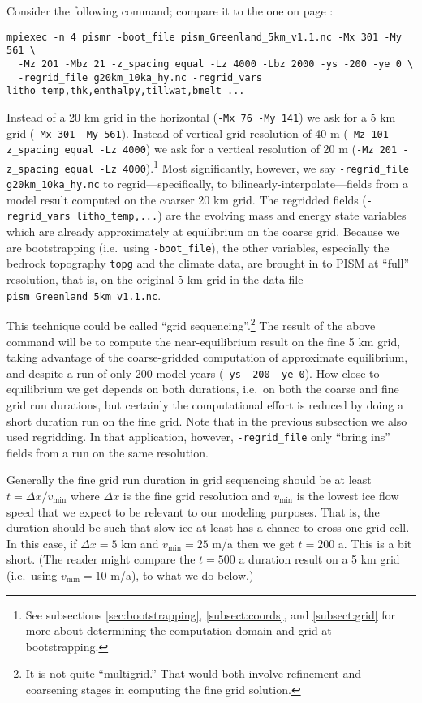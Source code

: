 Consider the following command; compare it to the one on page \pageref{firstcommand}:
\begin{verbatim}
mpiexec -n 4 pismr -boot_file pism_Greenland_5km_v1.1.nc -Mx 301 -My 561 \
  -Mz 201 -Mbz 21 -z_spacing equal -Lz 4000 -Lbz 2000 -ys -200 -ye 0 \
  -regrid_file g20km_10ka_hy.nc -regrid_vars litho_temp,thk,enthalpy,tillwat,bmelt ...
\end{verbatim}
Instead of a 20 km grid in the horizontal (\verb|-Mx 76 -My 141|) we ask for a 5 km grid (\verb|-Mx 301 -My 561|).  Instead of vertical grid resolution of 40 m (\verb|-Mz 101 -z_spacing equal -Lz 4000|) we ask for a vertical resolution of 20 m (\verb|-Mz 201 -z_spacing equal -Lz 4000|).\footnote{See subsections \ref{sec:bootstrapping}, \ref{subsect:coords}, and \ref{subsect:grid} for more about determining the computation domain and grid at bootstrapping.}  Most significantly, however, we say \verb|-regrid_file g20km_10ka_hy.nc| to regrid---specifically, to bilinearly-interpolate---fields from a model result computed on the coarser 20 km grid.  The regridded fields (\verb|-regrid_vars litho_temp,...|) are the evolving mass and energy state variables which are already approximately at equilibrium on the coarse grid.  Because we are bootstrapping (i.e.~using \verb|-boot_file|), the other variables, especially the bedrock topography \verb|topg| and the climate data, are brought in to PISM at ``full'' resolution, that is, on the original 5 km grid in the data file \texttt{pism_Greenland_5km_v1.1.nc}.

This technique could be called ``grid sequencing''.\footnote{It is not quite ``multigrid.''  That would both involve refinement and coarsening stages in computing the fine grid solution.}  The result of the above command will be to compute the near-equilibrium result on the fine 5 km grid, taking advantage of the coarse-gridded computation of approximate equilibrium, and despite a run of only 200 model years (\verb|-ys -200 -ye 0|).  How close to equilibrium we get depends on both durations, i.e.~on both the coarse and fine grid run durations, but certainly the computational effort is reduced by doing a short duration run on the fine grid.  Note that in the previous subsection we also used regridding.  In that application, however, \verb|-regrid_file| only ``bring ins'' fields from a run on the same resolution.

Generally the fine grid run duration in grid sequencing should be at least $t = \Delta x / v_{\text{min}}$ where $\Delta x$ is the fine grid resolution and $v_{\text{min}}$ is the lowest ice flow speed that we expect to be relevant to our modeling purposes.  That is, the duration should be such that slow ice at least has a chance to cross one grid cell.  In this case, if $\Delta x = 5$ km and $v_{\text{min}} = 25$ m/a then we get $t=200$ a.  This is a bit short.  (The reader might compare the $t=500$ a duration result on a 5 km grid (i.e.~using $v_{\text{min}} = 10$ m/a), to what we do below.)


